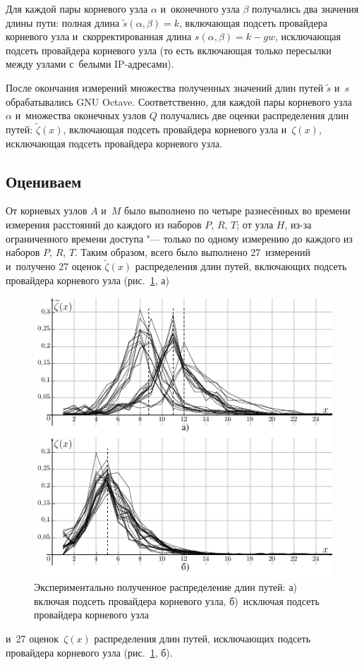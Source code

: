 \documentclass[10pt, a5paper]{article}
\begin{document}
Для каждой пары корневого узла $\alpha$ и~оконечного узла $\beta$ получались два значения длины пути:
полная длина $\widetilde{s}(\alpha, \beta) = k$, включающая подсеть  провайдера корневого узла
и~скорректированная длина ${s}(\alpha, \beta) = k-gw$, исключающая подсеть  провайдера корневого узла (то есть включающая только пересылки между узлами с~белыми IP-адресами).

После окончания измерений множества полученных значений длин путей $\widetilde{s}$ и~$s$ обрабатывались GNU Octave.
% 
Соответственно, для каждой пары корневого узла $\alpha$ и~множества оконечных узлов $Q$ получались две оценки распределения длин путей:
$\widetilde{\zeta}(x)$, включающая подсеть  провайдера корневого узла
и~$\zeta(x)$, исключающая подсеть  провайдера корневого узла.


\subsection*{Оцениваем}

От корневых узлов $A$ и~$M$ было выполнено по четыре разнесённых во времени измерения расстояний до каждого из наборов $P$, $R$, $T$;
от узла $H$, из-за ограниченного времени доступа "--- только по одному измерению до каждого из наборов $P$, $R$, $T$.
Таким образом, всего было выполнено 27~измерений и~получено 27 оценок $\widetilde{\zeta}(x)$ распределения длин путей, включающих подсеть провайдера корневого узла (рис.~\ref{zplot_2x1}, а)
\begin{figure}[h!]
  \centering
  \includegraphics[width=\linewidth]{2019_miet_kai_gav_zplot_2x1}
\caption{Экспериментально полученное распределение длин путей:
а) включая подсеть провайдера корневого узла,
б)~исключая подсеть провайдера корневого узла
}
\label{zplot_2x1}
\end{figure}%
и~27 оценок~$\zeta(x)$ распределения длин путей, исключающих подсеть провайдера корневого узла (рис.~\ref{zplot_2x1}, б).
\end{document}
